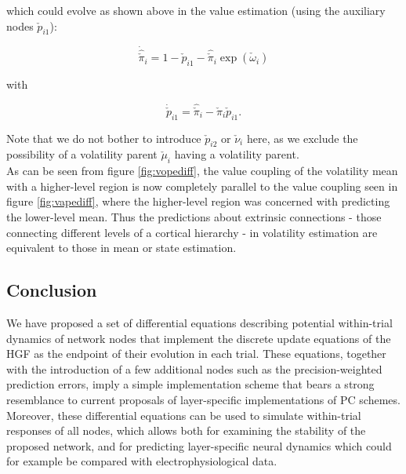 which could evolve as shown above in the value estimation (using the auxiliary nodes $\check{p}_{i1}$):

\begin{equation}
	\dot{\hat{\check{\pi}}}_i = 1 - \check{p}_{i1} - \hat{\check{\pi}}_i \exp(\check{\omega}_i)
\end{equation}

with

\begin{equation}
	\dot{\check{p}}_{i1} = \hat{\check{\pi}}_i - \check{\pi}_i \check{p}_{i1}. 
\end{equation}

Note that we do not bother to introduce $\check{p}_{i2}$ or $\check{\nu}_i$ here, as we exclude the possibility of a volatility parent $\check{\mu}_i$ having a volatility parent.\\

As can be seen from figure \ref{fig:vopediff}, the value coupling of the volatility mean with a higher-level region is now completely parallel to the value coupling seen in figure \ref{fig:vapediff}, where the higher-level region was concerned with predicting the lower-level mean. Thus the predictions about extrinsic connections - those connecting different levels of a cortical hierarchy - in volatility estimation are equivalent to those in mean or state estimation.


\subsection{Conclusion}

We have proposed a set of differential equations describing potential within-trial dynamics of network nodes that implement the discrete update equations of the HGF as the endpoint of their evolution in each trial. These equations, together with the introduction of a few additional nodes such as the precision-weighted prediction errors, imply a simple implementation scheme that bears a strong resemblance to current proposals of layer-specific implementations of \textsf{PC} schemes. \\

Moreover, these differential equations can be used to simulate within-trial responses of all nodes, which allows both for examining the stability of the proposed network, and for predicting layer-specific neural dynamics which could for example be compared with electrophysiological data. 